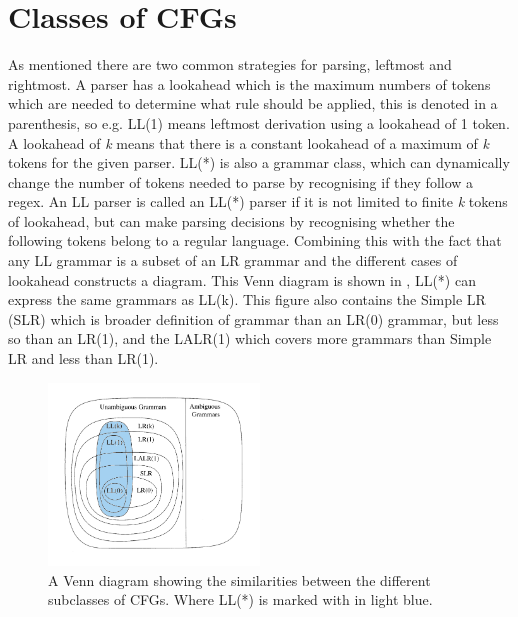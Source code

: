 \section{Classes of CFGs}
As mentioned there are two common strategies for parsing, leftmost and rightmost. 
A parser has a lookahead which is the maximum numbers of tokens which are needed to determine what rule should be applied, this is denoted in a parenthesis, so e.g. LL(1) means leftmost derivation using a lookahead of 1 token.
A lookahead of \emph{k} means that there is a constant lookahead of a maximum of \emph{k} tokens for the given parser. 
LL(*) is also a grammar class, which can dynamically change the number of tokens needed to parse by recognising if they follow a \acrlong{regex}.
An LL parser is called an LL(*) parser if it is not limited to finite \emph{k} tokens of lookahead, but can make parsing decisions by recognising whether the following tokens belong to a regular language.
Combining this with the fact that any LL grammar is a subset of an LR grammar and the different cases of lookahead constructs a diagram. 
This Venn diagram is shown in , LL(*) can express the same grammars as LL(k).
This figure also contains the Simple LR (SLR) which is broader definition of grammar than an LR(0) grammar, but less so than an LR(1), and the LALR(1) which covers more grammars than Simple LR and less than LR(1). 
\begin{figure}[!ht]
\centering
 \includegraphics[width=0.5\textwidth]{figures/classesofgrammars.png} %
\caption[A Venn diagram showing the similarities between the different subclasses of CFGs]{A Venn diagram showing the similarities between the different subclasses of CFGs. Where LL(*) is marked with in light blue. \citep{Lecture5}}
\label{fig:hierarchyofgrammars}
\vspace{-15pt}
\end{figure}
